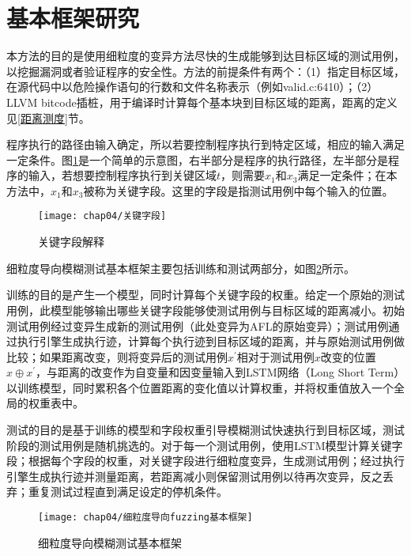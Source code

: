 \section{基本框架研究}

本方法的目的是使用细粒度的变异方法尽快的生成能够到达目标区域的测试用例，以挖掘漏洞或者验证程序的安全性。方法的前提条件有两个：（1）指定目标区域，在源代码中以危险操作语句的行数和文件名称表示（例如valid.c:6410）；（2）LLVM bitcode插桩，用于编译时计算每个基本块到目标区域的距离，距离的定义见\ref{距离测度}节。

程序执行的路径由输入确定，所以若要控制程序执行到特定区域，相应的输入满足一定条件。图\ref{关键字段}是一个简单的示意图，右半部分是程序的执行路径，左半部分是程序的输入，若想要控制程序执行到关键区域$t$，则需要$x_1$和$x_3$满足一定条件；在本方法中，$x_1$和$x_3$被称为关键字段。这里的字段是指测试用例中每个输入的位置。

\begin{figure}[htb]
\begin{center}
\texttt{[image: chap04/关键字段]}
\end{center}
\caption{关键字段解释}
\label{关键字段}
\end{figure}


细粒度导向模糊测试基本框架主要包括训练和测试两部分，如图\ref{细粒度导向fuzzing基本框架}所示。

训练的目的是产生一个模型，同时计算每个关键字段的权重。给定一个原始的测试用例，此模型能够输出哪些关键字段能够使测试用例与目标区域的距离减小。初始测试用例经过变异生成新的测试用例（此处变异为AFL的原始变异）；测试用例通过执行引擎生成执行迹，计算每个执行迹到目标区域的距离，并与原始测试用例做比较；如果距离改变，则将变异后的测试用例$x^{'}$相对于测试用例$x$改变的位置$x \oplus x^{'}$，与距离的改变作为自变量和因变量输入到LSTM网络（Long Short Term）以训练模型，同时累积各个位置距离的变化值以计算权重，并将权重值放入一个全局的权重表中。

测试的目的是基于训练的模型和字段权重引导模糊测试快速执行到目标区域，测试阶段的测试用例是随机挑选的。对于每一个测试用例，使用LSTM模型计算关键字段；根据每个字段的权重，对关键字段进行细粒度变异，生成测试用例；经过执行引擎生成执行迹并测量距离，若距离减小则保留测试用例以待再次变异，反之丢弃；重复测试过程直到满足设定的停机条件。

\begin{figure}[htb]
\begin{center}
\texttt{[image: chap04/细粒度导向fuzzing基本框架]}
\end{center}
\caption{细粒度导向模糊测试基本框架}
\label{细粒度导向fuzzing基本框架}
\end{figure}

